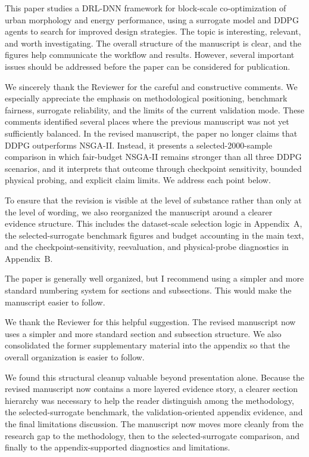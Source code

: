 %
%

\begin{ReviewerComment}
This paper studies a DRL-DNN framework for block-scale co-optimization of urban morphology and energy performance, using a surrogate model and DDPG agents to search for improved design strategies. The topic is interesting, relevant, and worth investigating. The overall structure of the manuscript is clear, and the figures help communicate the workflow and results. However, several important issues should be addressed before the paper can be considered for publication.
\end{ReviewerComment}
%
\begin{Answer}
We sincerely thank the Reviewer for the careful and constructive comments. We especially appreciate the emphasis on methodological positioning, benchmark fairness, surrogate reliability, and the limits of the current validation mode. These comments identified several places where the previous manuscript was not yet sufficiently balanced. In the revised manuscript, the paper no longer claims that DDPG outperforms NSGA-II. Instead, it presents a selected-2000-sample comparison in which fair-budget NSGA-II remains stronger than all three DDPG scenarios, and it interprets that outcome through checkpoint sensitivity, bounded physical probing, and explicit claim limits. We address each point below.

To ensure that the revision is visible at the level of substance rather than only at the level of wording, we also reorganized the manuscript around a clearer evidence structure. This includes the dataset-scale selection logic in Appendix~A, the selected-surrogate benchmark figures and budget accounting in the main text, and the checkpoint-sensitivity, reevaluation, and physical-probe diagnostics in Appendix~B.
\end{Answer}

\begin{ReviewerComment}
The paper is generally well organized, but I recommend using a simpler and more standard numbering system for sections and subsections. This would make the manuscript easier to follow.
\end{ReviewerComment}
%
\begin{Answer}
We thank the Reviewer for this helpful suggestion. The revised manuscript now uses a simpler and more standard section and subsection structure. We also consolidated the former supplementary material into the appendix so that the overall organization is easier to follow.

We found this structural cleanup valuable beyond presentation alone. Because the revised manuscript now contains a more layered evidence story, a clearer section hierarchy was necessary to help the reader distinguish among the methodology, the selected-surrogate benchmark, the validation-oriented appendix evidence, and the final limitations discussion. The manuscript now moves more cleanly from the research gap to the methodology, then to the selected-surrogate comparison, and finally to the appendix-supported diagnostics and limitations.
\end{Answer}

